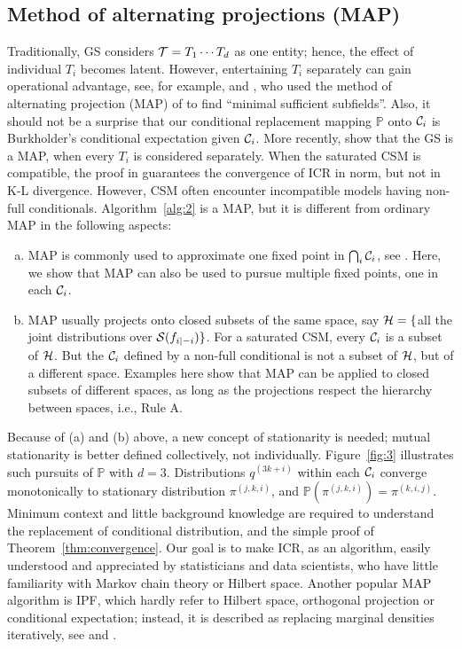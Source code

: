 \documentclass[12pt,a4paper]{article}
\begin{document}
\subsection{Method of alternating projections (MAP)}\label{sec:4-4}
Traditionally, GS considers  ${\cal T}=T_1\cdots T_d$ as one entity; hence,  the effect of individual $T_i$  becomes latent.
However, entertaining $T_i$ separately can gain operational advantage, see, for example,  \citet{Burkholder1961}  and \citet{Burkholder1962}, who used the method of alternating projection (MAP) of \citet{Neumann1950} to find  ``minimal sufficient subfields''.
Also,  it should not be a surprise that our conditional replacement mapping ${\mathbb P}$ onto ${\cal C}_i$ is Burkholder's conditional expectation given ${\cal C}_i$.
More recently, \citet{Diaconis2010} show that the GS is a MAP, when every $T_i$ is considered separately.  When the saturated CSM is compatible,  the proof in \citet{Diaconis2010} guarantees the convergence of ICR in norm, but not in K-L divergence.   However, CSM  often encounter incompatible models having  non-full conditionals. Algorithm~\ref{alg:2} is a MAP, but it is different from ordinary MAP in the following aspects:
\begin{enumerate}[(a)]
\item MAP is commonly used to approximate one fixed point in $\bigcap_i {\cal C}_i$, see \citet{Diaconis2010}.  Here, we show that MAP can also be used to pursue multiple fixed points, one in each ${\cal C}_i$.
\item MAP usually projects onto closed subsets of the same  space, say ${\cal H}=\{$all the joint distributions over ${\cal S}(f_{i|-i}) \}$.   For a saturated CSM,  every ${\cal C}_i$ is a subset of ${\cal H}$.   But the ${\cal C}_i$ defined by a non-full conditional is not a subset of ${\cal H}$, but of a different  space.   Examples here show that MAP  can be applied to closed subsets of different spaces, as long as the projections respect the hierarchy between  spaces, i.e., {\sf Rule A}.
\end{enumerate}
Because of (a) and (b) above, a new concept of  stationarity is needed;
mutual stationarity is better defined collectively, not individually.
Figure~\ref{fig:3} illustrates such pursuits of ${\mathbb P}$ with  $d=3$.  Distributions $q^{(3k+i)}$ within each ${\cal C}_i$ converge monotonically to stationary distribution $\pi^{(j,k,i)}$, and ${\mathbb P}(\pi^{(j,k,i)})= \pi^{(k,i,j)}$.
Minimum context and little background knowledge are required to understand the replacement of conditional distribution, and the simple proof of Theorem~\ref{thm:convergence}.
Our goal is to make ICR, as an algorithm, easily understood  and appreciated by statisticians and data scientists, who have little familiarity with Markov chain theory or Hilbert space.
Another popular MAP algorithm is IPF, which hardly refer to Hilbert space, orthogonal projection or conditional expectation; instead, it is described as replacing marginal densities iteratively, see \citet{Darroch1972} and \citet{Wang1993}.
\end{document}
